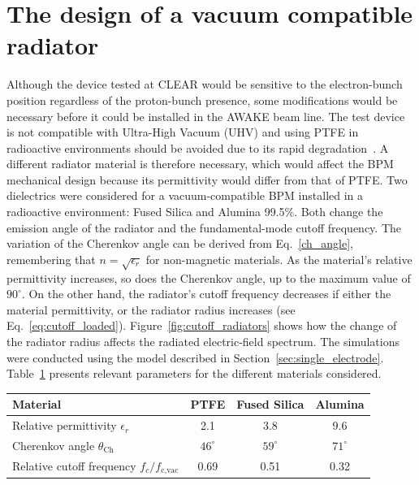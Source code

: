 \section[The design of a vacuum compatible radiator]{The design of a vacuum compatible radiator}

Although the device tested at CLEAR would be sensitive to the electron-bunch position regardless of the proton-bunch presence, some modifications would be necessary before it could be installed in the AWAKE beam line. The test device is not compatible with Ultra-High Vacuum (UHV) and using PTFE in radioactive environments should be avoided due to its rapid degradation~\cite{PTFE:no-vac}. A different radiator material is therefore necessary, which would affect the BPM mechanical design because its permittivity would differ from that of PTFE. Two dielectrics were considered for a vacuum-compatible BPM installed in a radioactive environment: Fused Silica and Alumina 99.5\%. Both change the emission angle of the radiator and the fundamental-mode cutoff frequency. The variation of the Cherenkov angle can be derived from Eq.~\ref{ch_angle}, remembering that $n = \sqrt{\epsilon_r}$ for non-magnetic materials. As the material's relative permittivity increases, so does the Cherenkov angle, up to the maximum value of $90^\circ$. 
On the other hand, the radiator's cutoff frequency decreases if either the material permittivity, or the radiator radius increases (see Eq.~\ref{eq:cutoff_loaded}). Figure~\ref{fig:cutoff_radiators} shows how  the change of the radiator radius affects the radiated electric-field spectrum. The simulations were conducted using the model described in Section~\ref{sec:single_electrode}.
Table~\ref{tab:radiator_materials} presents relevant parameters for the different materials considered. 

\begin{table}[!b]
    \centering
    \begin{tabular}{l c c c}
    \toprule
    Material    & PTFE & Fused Silica & Alumina  \\
    \midrule
    Relative permittivity $\epsilon_r$ & 2.1 & 3.8 & 9.6\\
    Cherenkov angle     $\theta_\text{Ch}$ & $46^\circ$ & $59^\circ$ & $71^\circ$ \\
    Relative cutoff frequency   $f_c/f_\text{c,vac}$    & 0.69 & 0.51 & 0.32\\
    \bottomrule
    \end{tabular}
    \label{tab:radiator_materials}
\end{table}


